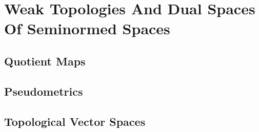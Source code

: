 \section{Weak Topologies And Dual Spaces Of Seminormed Spaces}
\subsection{Quotient Maps}





 

 





\subsection{Pseudometrics}
















\subsection{Topological Vector Spaces} 






